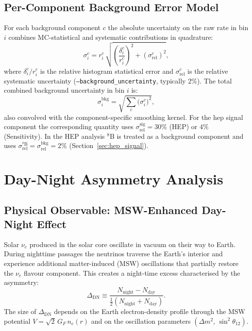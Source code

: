 \documentclass[12pt,a4paper]{article}
\newcommand{\srel}{\sigma_{\mathrm{rel}}}
\begin{document}
\subsection{Per-Component Background Error Model}
\label{sec:bkg_error}

For each background component $c$ the absolute uncertainty on the raw
rate in bin $i$ combines MC-statistical and systematic contributions in
quadrature:
\begin{equation}
  \sigma_{i}^{c}
  = r_i^{c}\,
    \sqrt{\left(\frac{\delta_i^c}{r_i^c}\right)^{\!2}
          + \left(\srel^c\right)^2},
  \label{eq:bin_error}
\end{equation}
where $\delta_i^c / r_i^c$ is the relative histogram statistical error
and $\srel^c$ is the relative systematic uncertainty
(\texttt{--background\_uncertainty}, typically 2\%).
The total combined background uncertainty in bin $i$ is:
\begin{equation}
  \sigma_i^{\mathrm{bkg}} = \sqrt{\sum_c \bigl(\sigma_i^c\bigr)^2},
  \label{eq:combined_error}
\end{equation}
also convolved with the component-specific smoothing kernel.
For the hep signal component the corresponding quantity uses
$\srel^{\mathrm{sig}} = 30\%$ (HEP) or $4\%$ (Sensitivity).
In the HEP analysis ${}^8$B is treated as a background component and uses
$\srel^{{}^8\mathrm{B}} = \srel^{\mathrm{bkg}} = 2\%$
(Section~\ref{sec:hep_signal}).

\section{Day-Night Asymmetry Analysis}
\label{sec:daynight}

\subsection{Physical Observable: MSW-Enhanced Day-Night Effect}
\label{sec:dn_physics}

Solar $\nu_e$ produced in the solar core oscillate in vacuum on their way to
Earth.  During nighttime passages the neutrinos traverse the Earth's interior
and experience additional matter-induced (MSW) oscillations that partially
restore the $\nu_e$ flavour component.  This creates a night-time excess
characterised by the asymmetry:
\begin{equation}
  \Delta_{\mathrm{DN}} \equiv \frac{N_{\mathrm{night}} - N_{\mathrm{day}}}
    {{\tfrac{1}{2}(N_{\mathrm{night}} + N_{\mathrm{day}})}}.
  \label{eq:dn_asymmetry}
\end{equation}
The size of $\Delta_{\mathrm{DN}}$ depends on the Earth electron-density
profile through the MSW potential $V = \sqrt{2}\,G_F\, n_e(r)$
and on the oscillation parameters $(\Delta m^2,\,\sin^2\theta_{12})$.
\end{document}
